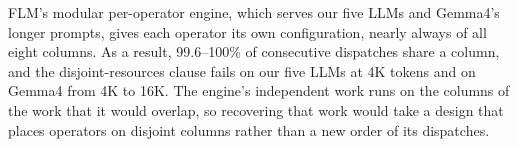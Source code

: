 FLM's modular per-operator engine, which serves our five LLMs and Gemma4's longer prompts, gives each operator its own configuration, nearly always of all eight columns.
As a result, 99.6--100\% of consecutive dispatches share a column, and the disjoint-resources clause fails on our five LLMs at 4K tokens and on Gemma4 from 4K to 16K.
The engine's independent work runs on the columns of the work that it would overlap, so recovering that work would take a design that places operators on disjoint columns rather than a new order of its dispatches.

